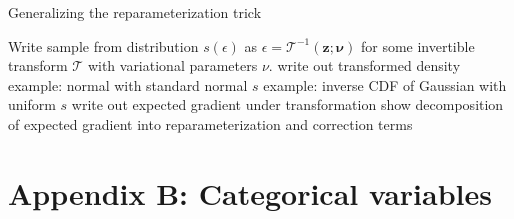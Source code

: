 \documentclass{article}
\begin{document}





\par{Generalizing the reparameterization trick}

Write sample from distribution $s(\epsilon)$ as $\epsilon = \mathcal{T}^{-1}(\mathbf{z}; \mathbf{\nu})$ for some invertible transform $\mathcal{T}$ with variational parameters $\nu$.
write out transformed density
example: normal with standard normal $s$
example: inverse CDF of Gaussian with uniform $s$
write out expected gradient under transformation
show decomposition of expected gradient into reparameterization and correction terms 






\section{Appendix B: Categorical variables}
\end{document}
